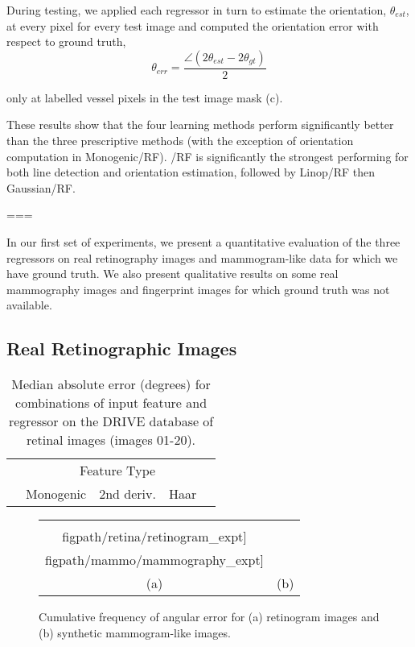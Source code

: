During testing, we applied each regressor in turn to estimate the orientation, $\theta_{est}$, at every pixel for every test image and computed the orientation error with respect to ground truth,
%
\begin{equation}
	\theta_{err} = \frac{\angle(2\theta_{est}-2\theta_{gt})}{2}
\end{equation}

\noindent only at labelled vessel pixels in the test image mask (c).

These results show that the four learning methods perform significantly better than the three prescriptive methods (with the exception of orientation computation in Monogenic/RF). \dtcwt{}/RF is significantly the strongest performing for both line detection and orientation estimation, followed by Linop/RF then Gaussian/RF.

===

In our first set of experiments, we present a quantitative evaluation of the three regressors on real retinography images and mammogram-like data for which we have ground truth. We also present qualitative results on some real mammography images and fingerprint images for which ground truth was not available.


\subsection{Real Retinographic Images}
\label{s:expts_retinography}

\begin{table}[b]
\centering
\begin{tabular}{l|c c c c}
							& \multicolumn{4}{c}{Feature Type} \\
							& Monogenic		& 2nd deriv.	& Haar				& \dtcwt{} \\
\hline

\end{tabular}
%
\caption{Median absolute error (degrees) for combinations of input feature and regressor on the DRIVE database of retinal images (images 01-20).}
\label{t:retinopathy}
\end{table}

\begin{figure}
\centering
\begin{tabular}{c c}
\texttt{[image: \\figpath/retina/retinogram\_expt]} &
\texttt{[image: \\figpath/mammo/mammography\_expt]} \\
(a) & (b) \\
\end{tabular}
%
\caption{Cumulative frequency of angular error for (a) retinogram images and (b) synthetic mammogram-like images.}
\label{f:cumfreq}
\end{figure}

